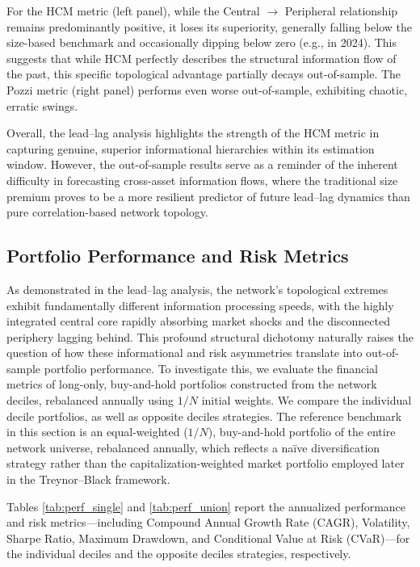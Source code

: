 \documentclass[fleqn]{rbfin}
\begin{document}
For the HCM metric (left panel), while the Central $\rightarrow$ Peripheral relationship remains predominantly positive, it loses its superiority, generally falling below the size-based benchmark and occasionally dipping below zero (e.g., in 2024). This suggests that while HCM perfectly describes the structural information flow of the past, this specific topological advantage partially decays out-of-sample. The Pozzi metric (right panel) performs even worse out-of-sample, exhibiting chaotic, erratic swings.

Overall, the lead--lag analysis highlights the strength of the HCM metric in capturing genuine, superior informational hierarchies within its estimation window. However, the out-of-sample results serve as a reminder of the inherent difficulty in forecasting cross-asset information flows, where the traditional size premium proves to be a more resilient predictor of future lead--lag dynamics than pure correlation-based network topology.

\subsection{Portfolio Performance and Risk Metrics}

\noindent As demonstrated in the lead--lag analysis, the network's topological extremes exhibit fundamentally different information processing speeds, with the highly integrated central core rapidly absorbing market shocks and the disconnected periphery lagging behind. This profound structural dichotomy naturally raises the question of how these informational and risk asymmetries translate into out-of-sample portfolio performance. To investigate this, we evaluate the financial metrics of long-only, buy-and-hold portfolios constructed from the network deciles, rebalanced annually using $1/N$ initial weights. We compare the individual decile portfolios, as well as opposite deciles strategies. The reference benchmark in this section is an equal-weighted ($1/N$), buy-and-hold portfolio of the entire network universe, rebalanced annually, which reflects a naïve diversification strategy rather than the capitalization-weighted market portfolio employed later in the Treynor--Black framework. 

Tables \ref{tab:perf_single} and \ref{tab:perf_union} report the annualized performance and risk metrics—including Compound Annual Growth Rate (CAGR), Volatility, Sharpe Ratio, Maximum Drawdown, and Conditional Value at Risk (CVaR)—for the individual deciles and the opposite deciles strategies, respectively. 
\end{document}
